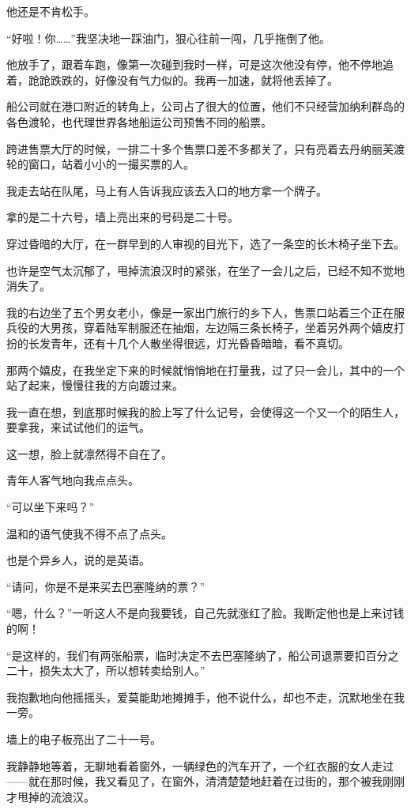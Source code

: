 \par 他还是不肯松手。
\par “好啦！你……”我坚决地一踩油门，狠心往前一闯，几乎拖倒了他。
\par 他放手了，跟着车跑，像第一次碰到我时一样，可是这次他没有停，他不停地追着，跄跄跌跌的，好像没有气力似的。我再一加速，就将他丢掉了。
\par 船公司就在港口附近的转角上，公司占了很大的位置，他们不只经营加纳利群岛的各色渡轮，也代理世界各地船运公司预售不同的船票。
\par 跨进售票大厅的时候，一排二十多个售票口差不多都关了，只有亮着去丹纳丽芙渡轮的窗口，站着小小的一撮买票的人。
\par 我走去站在队尾，马上有人告诉我应该去入口的地方拿一个牌子。
\par 拿的是二十六号，墙上亮出来的号码是二十号。
\par 穿过昏暗的大厅，在一群早到的人审视的目光下，选了一条空的长木椅子坐下去。
\par 也许是空气太沉郁了，甩掉流浪汉时的紧张，在坐了一会儿之后，已经不知不觉地消失了。
\par 我的右边坐了五个男女老小，像是一家出门旅行的乡下人，售票口站着三个正在服兵役的大男孩，穿着陆军制服还在抽烟，左边隔三条长椅子，坐着另外两个嬉皮打扮的长发青年，还有十几个人散坐得很远，灯光昏昏暗暗，看不真切。
\par 那两个嬉皮，在我坐定下来的时候就悄悄地在打量我，过了只一会儿，其中的一个站了起来，慢慢往我的方向踱过来。
\par 我一直在想，到底那时候我的脸上写了什么记号，会使得这一个又一个的陌生人，要拿我，来试试他们的运气。
\par 这一想，脸上就凛然得不自在了。
\par 青年人客气地向我点点头。
\par “可以坐下来吗？”
\par 温和的语气使我不得不点了点头。
\par 也是个异乡人，说的是英语。
\par “请问，你是不是来买去巴塞隆纳的票？”
\par “嗯，什么？”一听这人不是向我要钱，自己先就涨红了脸。我断定他也是上来讨钱的啊！
\par “是这样的，我们有两张船票，临时决定不去巴塞隆纳了，船公司退票要扣百分之二十，损失太大了，所以想转卖给别人。”
\par 我抱歉地向他摇摇头，爱莫能助地摊摊手，他不说什么，却也不走，沉默地坐在我一旁。
\par 墙上的电子板亮出了二十一号。
\par 我静静地等着，无聊地看着窗外，一辆绿色的汽车开了，一个红衣服的女人走过——就在那时候，我又看见了，在窗外，清清楚楚地赶着在过街的，那个被我刚刚才甩掉的流浪汉。

